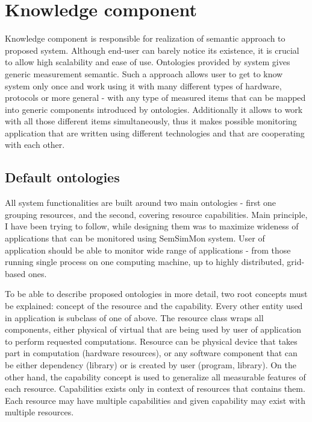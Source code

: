 %


\section{Knowledge component}
\label{sec:arch_knowledge}
 

Knowledge component is responsible for realization of semantic approach to proposed system. Although end-user can
barely notice its existence, it is crucial to allow high scalability and ease of use. Ontologies provided by
system gives generic measurement semantic. Such a approach allows user to get to know system only once and work using
it with many different types of hardware, protocols or more general - with any type of measured items that can be
mapped into generic components introduced by ontologies. Additionally it allows to work with all those different items
simultaneously, thus it makes possible monitoring application that are written using different technologies
and that are cooperating with each other.

\subsection{Default ontologies}

All system functionalities are built around two main ontologies - first one grouping resources, and the second, covering
resource capabilities. Main principle, I have been trying to follow, while designing them was to maximize wideness of
applications that can be monitored using SemSimMon system. User of application should be able to monitor wide range of
applications - from those running single process on one computing machine, up to highly distributed, grid-based ones.

To be able to describe proposed ontologies in more detail, two root concepts must be explained: concept of the
resource and the capability. Every other entity used in application is subclass of one of above. The resource
class wraps all components, either physical of virtual that are being used by user of application to
perform requested computations. Resource can be physical device that takes part in computation (hardware
resources), or any software component that can be either dependency (library) or is created by user (program, library).
On the other hand, the capability concept is used to generalize all measurable features of each resource. Capabilities
exists only in context of resources that contains them. Each resource may have multiple capabilities and given
capability may exist with multiple resources.

